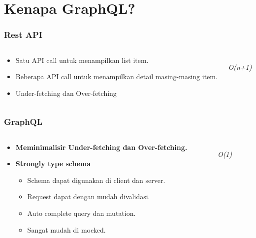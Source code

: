 \documentclass[12pt,xcolor=table]{beamer}
\begin{document}
\section{Kenapa GraphQL?}

\begin{frame}
\frametitle{Rest API}
\begin{columns}
\begin{column}{0.6\textwidth}
    \begin{itemize}
        \item Satu API call untuk menampilkan list item.
        \item Beberapa API call untuk menampilkan detail masing-masing item.
        \item Under-fetching dan Over-fetching
    \end{itemize}
\end{column}
\begin{column}{0.4\textwidth}  %
    \inputminted{bash}{code/rest.text}
    \textit{O(n+1)}
\end{column}
\end{columns}
\end{frame}

\begin{frame}
\frametitle{GraphQL}
\begin{columns}
\begin{column}{0.6\textwidth}
    \begin{itemize}
        \item \textbf{Meminimalisir Under-fetching dan Over-fetching.}
        \item \textbf{Strongly type schema}
            \begin{itemize}
                \item Schema dapat digunakan di client dan server.
                \item Request dapat dengan mudah divalidasi.
                \item Auto complete query dan mutation.
                \item Sangat mudah di mocked.
            \end{itemize}
    \end{itemize}
\end{column}
\begin{column}{0.4\textwidth}  %
    \inputminted{bash}{code/graphql.text}
    \textit{O(1)}
\end{column}
\end{columns}
\end{frame}
\end{document}
